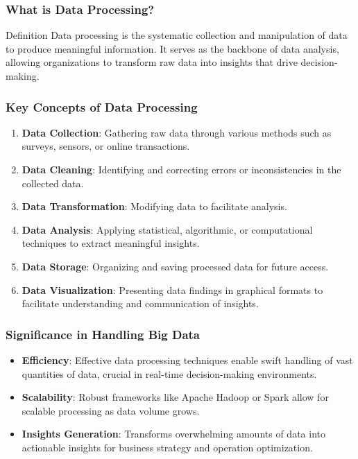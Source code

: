 \documentclass[aspectratio=169]{beamer}
\begin{document}
\frame{\titlepage}

\begin{frame}[fragile]
    \titlepage
\end{frame}

\begin{frame}[fragile]
    \frametitle{What is Data Processing?}
    \begin{block}{Definition}
        Data processing is the systematic collection and manipulation of data to produce meaningful information. It serves as the backbone of data analysis, allowing organizations to transform raw data into insights that drive decision-making.
    \end{block}
\end{frame}

\begin{frame}[fragile]
    \frametitle{Key Concepts of Data Processing}
    \begin{enumerate}
        \item \textbf{Data Collection}: Gathering raw data through various methods such as surveys, sensors, or online transactions.
        \item \textbf{Data Cleaning}: Identifying and correcting errors or inconsistencies in the collected data.
        \item \textbf{Data Transformation}: Modifying data to facilitate analysis.
        \item \textbf{Data Analysis}: Applying statistical, algorithmic, or computational techniques to extract meaningful insights.
        \item \textbf{Data Storage}: Organizing and saving processed data for future access.
        \item \textbf{Data Visualization}: Presenting data findings in graphical formats to facilitate understanding and communication of insights.
    \end{enumerate}
\end{frame}

\begin{frame}[fragile]
    \frametitle{Significance in Handling Big Data}
    \begin{itemize}
        \item \textbf{Efficiency}: Effective data processing techniques enable swift handling of vast quantities of data, crucial in real-time decision-making environments.
        \item \textbf{Scalability}: Robust frameworks like Apache Hadoop or Spark allow for scalable processing as data volume grows.
        \item \textbf{Insights Generation}: Transforms overwhelming amounts of data into actionable insights for business strategy and operation optimization.
    \end{itemize}
\end{frame}
\end{document}
